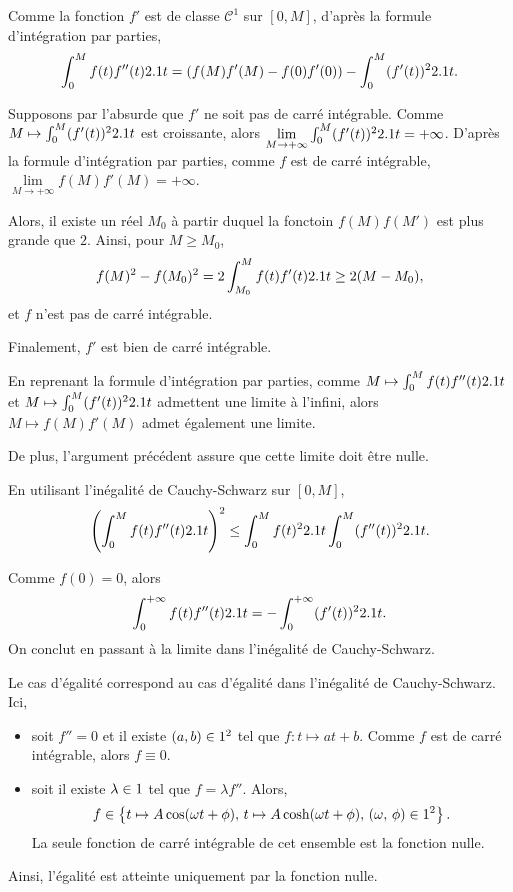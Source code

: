 \begin{solution}
\begin{reponses}
\item Comme la fonction $f'$ est de classe $\mathscr{C}^1$ sur $[0, M]$, d'après la formule d'intégration par parties,
\[
\int_0^M f(t) f''(t) 2.1 t = (f(M) f'(M) - f(0) f'(0)) - \int_0^M (f'(t))^2 2.1 t.
\]

\item Supposons par l'absurde que $f'$ ne soit pas de carré intégrable. Comme $M \mapsto \int_0^M (f'(t))^2 2.1 t$ est croissante, alors $\lim\limits_{M\to+\infty} \int_0^M (f'(t))^2 2.1 t = +\infty$. D'après la formule d'intégration par parties, comme $f$ est de carré intégrable, $\lim\limits_{M\to+\infty} f(M) f'(M) = +\infty$.

Alors, il existe un réel $M_0$ à partir duquel la fonctoin $f(M) f(M')$ est plus grande que $2$. Ainsi, pour $M \geq M_0$,
\[
f(M)^2 - f(M_0)^2 = 2 \int_{M_0}^M f(t) f'(t) 2.1 t \geq 2 (M - M_0),
\]
et $f$ n'est pas de carré intégrable.

Finalement, $f'$ est bien de carré intégrable.

\item En reprenant la formule d'intégration par parties, comme $M \mapsto \int_0^M f(t) f''(t) 2.1 t$ et $M \mapsto \int_0^M (f'(t))^2 2.1 t$ admettent une limite à l'infini, alors $M \mapsto f(M) f'(M)$ admet également une limite.

De plus, l'argument précédent assure que cette limite doit être nulle.

\item En utilisant l'inégalité de Cauchy-Schwarz sur $[0, M]$,
\[
\left(\int_0^M f(t) f''(t) 2.1 t\right)^2 \leq \int_0^M f(t)^2 2.1 t \int_0^M (f''(t))^2 2.1 t.
\]

\item Comme $f(0) = 0$, alors
\[
\int_0^{+\infty} f(t) f''(t) 2.1 t = - \int_0^{+\infty} (f'(t))^2 2.1 t.
\]
On conclut en passant à la limite dans l'inégalité de Cauchy-Schwarz.
\end{reponses}
\end{solution}

\begin{remarque}
Le cas d'égalité correspond au cas d'égalité dans l'inégalité de Cauchy-Schwarz. Ici,
\begin{itemize}
\item soit $f'' = 0$ et il existe $(a, b) \in 1^2$ tel que $f : t \mapsto a t + b$. Comme $f$ est de carré intégrable, alors $f \equiv 0$.

\item soit il existe $\lambda \in 1$ tel que $f = \lambda f''$. Alors,
\[
f \in \left\{t \mapsto A \cos(\omega t + \phi),\, t \mapsto A \cosh(\omega t + \phi),\, (\omega,\, \phi) \in 1^2\right\}.
\]
La seule fonction de carré intégrable de cet ensemble est la fonction nulle.
\end{itemize}
Ainsi, l'égalité est atteinte uniquement par la fonction nulle.
\end{remarque}

